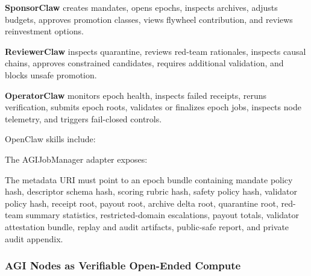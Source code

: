 \textbf{SponsorClaw} creates mandates, opens epochs, inspects archives,
adjusts budgets, approves promotion classes, views flywheel
contribution, and reviews reinvestment options.

\textbf{ReviewerClaw} inspects quarantine, reviews red-team rationales,
inspects causal chains, approves constrained candidates, requires
additional validation, and blocks unsafe promotion.

\textbf{OperatorClaw} monitors epoch health, inspects failed receipts,
reruns verification, submits epoch roots, validates or finalizes epoch
jobs, inspects node telemetry, and triggers fail-closed controls.

OpenClaw skills include:

\begin{Shaded}
\begin{Highlighting}[]
\end{Highlighting}
\end{Shaded}

The AGIJobManager adapter exposes:

\begin{Shaded}
\begin{Highlighting}[]
\end{Highlighting}
\end{Shaded}

The metadata URI must point to an epoch bundle containing mandate policy
hash, descriptor schema hash, scoring rubric hash, safety policy hash,
validator policy hash, receipt root, payout root, archive delta root,
quarantine root, red-team summary statistics, restricted-domain
escalations, payout totals, validator attestation bundle, replay and
audit artifacts, public-safe report, and private audit appendix.

\subsubsection{AGI Nodes as Verifiable Open-Ended
Compute}\label{agi-nodes-as-verifiable-open-ended-compute}

